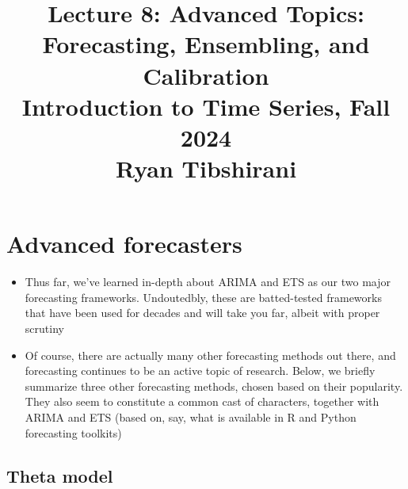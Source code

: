 \documentclass{article}
\title{Lecture 8: Advanced Topics: Forecasting, Ensembling, and Calibration \\
  \smallskip   
\large Introduction to Time Series, Fall 2024 \\ \smallskip
Ryan Tibshirani}
\date{}
\begin{document}
\maketitle
\RaggedRight
\vspace{-50pt}

\section{Advanced forecasters}

\begin{itemize}
\item Thus far, we've learned in-depth about ARIMA and ETS as our two major 
  forecasting frameworks. Undoutedbly, these are batted-tested frameworks that 
  have been used for decades and will take you far, albeit with proper scrutiny 

\item Of course, there are actually many other forecasting methods out there,
  and forecasting continues to be an active topic of research. Below, we briefly 
  summarize three other forecasting methods, chosen based on their popularity.
  They also seem to constitute a common cast of characters, together with ARIMA  
  and ETS (based on, say, what is available in R and Python forecasting
  toolkits)    
\end{itemize}

\subsection{Theta model}
\end{document}
